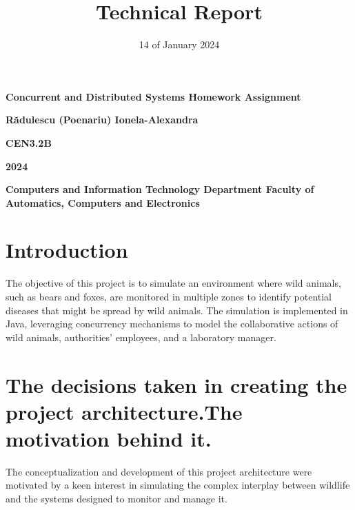 \documentclass{article}
\begin{document}
\thispagestyle{empty} %

\begin{center}
    \vspace*{2cm}
    
    \Huge\textbf{Concurrent and Distributed Systems
Homework Assignment}
    
    \vspace{2cm}
    
    \LARGE\textbf{Rădulescu (Poenariu) Ionela-Alexandra}
    
    \vspace{1cm}
    
    \Large\textbf{CEN3.2B}
    
    \vspace{1cm}
    
    \large\textbf{2024}
    
    \vfill
    
    \Large\textbf{Computers and Information Technology Department
Faculty of Automatics, Computers and Electronics}
\end{center}

\title{Technical Report}
\date{14 of January 2024}
\maketitle

\section{Introduction}
The objective of this project is to simulate an environment where wild animals, such as bears and foxes, are monitored in multiple zones to identify potential diseases that might be spread by wild animals. The simulation is implemented in Java, leveraging concurrency mechanisms to model the collaborative actions of wild animals, authorities' employees, and a laboratory manager.

\section{The decisions taken in creating the project architecture.The motivation behind it.}
The conceptualization and development of this project architecture were motivated by a keen interest in simulating the complex interplay between wildlife and the systems designed to monitor and manage it.
\end{document}
